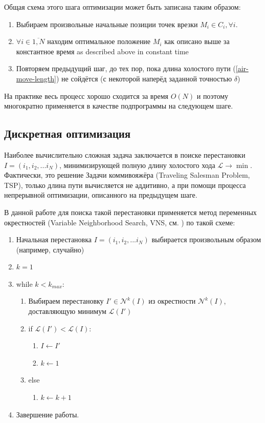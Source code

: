 \documentclass[14pt]{extarticle}
\theoremstyle{plain}%
\theoremstyle{remark}
\begin{document}
Общая схема этого шага оптимизации может быть записана таким образом:
\begin{enumerate}
  \item
  Выбираем произвольные начальные позиции точек врезки
  $M_i \in C_i, \forall i$.
  \item
  $\forall i \in \overline{1,N}$
  находим оптимальное положение
  $M_i$
  как описано выше за константное время
  as described above in constant time
  \item
  Повторяем предыдущий шаг,
  до тех пор,
  пока длина холостого пути
  (\ref{air-move-length})
  не сойдётся
  (с некоторой наперёд заданной точностью $\delta$)
\end{enumerate}

На практике весь процесс хорошо сходится
за время
$O(N)$
и поэтому многократно применяется
в качестве подпрограммы на следующем шаге.

\subsection{Дискретная оптимизация}

Наиболее вычислительно сложная задача
заключается в поиске перестановки
$I = (i_1, i_2, ... i_N)$,
минимизирующей полную длину холостого хода
$\mathcal{L} \to \min$.
Фактически,
это решение
Задачи коммивояжёра
(Traveling Salesman Problem, TSP),
только длина пути вычисляется
не аддитивно,
а при помощи процесса
непрерывной оптимизации,
описанного на предыдущем шаге.

В данной работе для поиска
такой перестановки применяется
метод переменных окрестностей
(Variable Neighborhood Search,
VNS, см. \cite{bi14})
по такой схеме:

\begin{enumerate}[label*=\arabic*.]
  \item Начальная перестановка
  $I = (i_1, i_2, ... i_N)$
  выбирается произвольным образом
  (например, случайно)
  \item $k=1$
  \item while $k < k_{max}$:
  \begin{enumerate}
    [label*=\arabic*.]
    \item Выбираем перестановку $I' \in \mathcal N^k(I)$
    из окрестности
    $\mathcal N^k(I)$,
    доставляющую минимум
    $\mathcal L(I')$
    \item if $\mathcal L(I')< \mathcal L(I)$:
    \begin{enumerate}[label*=\arabic*.]
      \item $I \gets I'$
      \item $k \gets 1$
    \end{enumerate}
    \item else
    \begin{enumerate}[label*=\arabic*.]
      \item $k \gets k+1$
    \end{enumerate}
  \end{enumerate}
  \item Завершение работы.
\end{enumerate}
\end{document}

